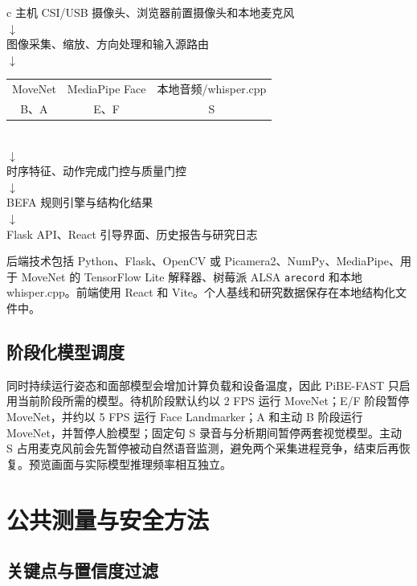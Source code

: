 \documentclass[11pt,a4paper]{article}
\begin{document}
\begin{center}
\begin{tabular}{c}
\toprule
主机 CSI/USB 摄像头、浏览器前置摄像头和本地麦克风 \\
$\downarrow$ \\
图像采集、缩放、方向处理和输入源路由 \\
$\downarrow$ \\
\begin{tabular}{ccc}
MoveNet & MediaPipe Face & 本地音频/whisper.cpp \\
B、A & E、F & S
\end{tabular} \\
$\downarrow$ \\
时序特征、动作完成门控与质量门控 \\
$\downarrow$ \\
BEFA 规则引擎与结构化结果 \\
$\downarrow$ \\
Flask API、React 引导界面、历史报告与研究日志 \\
\bottomrule
\end{tabular}
\end{center}

后端技术包括 Python、Flask、OpenCV 或 Picamera2、NumPy、MediaPipe、用于 MoveNet 的 TensorFlow Lite 解释器、树莓派 ALSA \texttt{arecord} 和本地 whisper.cpp。前端使用 React 和 Vite。个人基线和研究数据保存在本地结构化文件中。

\subsection{阶段化模型调度}

同时持续运行姿态和面部模型会增加计算负载和设备温度，因此 PiBE-FAST 只启用当前阶段所需的模型。待机阶段默认约以 2 FPS 运行 MoveNet；E/F 阶段暂停 MoveNet，并约以 5 FPS 运行 Face Landmarker；A 和主动 B 阶段运行 MoveNet，并暂停人脸模型；固定句 S 录音与分析期间暂停两套视觉模型。主动 S 占用麦克风前会先暂停被动自然语音监测，避免两个采集进程竞争，结束后再恢复。预览画面与实际模型推理频率相互独立。

\section{公共测量与安全方法}

\subsection{关键点与置信度过滤}
\end{document}
